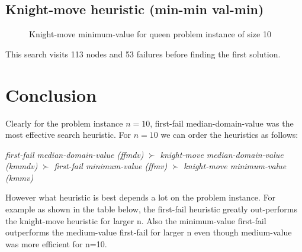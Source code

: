 \documentclass[a4paper, 11pt]{article}
\begin{document}
\subsection{Knight-move heuristic (min-min val-min)}
\begin{figure}[H]
  \begin{center}
    \caption{Knight-move minimum-value for queen problem instance of size 10}
    \label{fig:kmv10}
  \end{center}
\end{figure}
This search visits 113 nodes and 53 failures before finding the first solution.

\section{Conclusion}
Clearly for the problem instance $n = 10$, first-fail median-domain-value was the most effective search heuristic. For $n=10$ we can order the heuristics as follows:

\textit{first-fail median-domain-value (ffmdv)} $\succ$ \textit{knight-move median-domain-value (kmmdv)} $\succ$ \textit{first-fail minimum-value (ffmv)} $\succ$ \textit{knight-move minimum-value (kmmv)}

However what heuristic is best depends a lot on the problem instance. For example as shown in the table below, the first-fail heuristic greatly out-performs the knight-move heuristic for larger n. Also the minimum-value first-fail outperforms the medium-value first-fail for larger n even though medium-value was more efficient for n=10.
\end{document}
